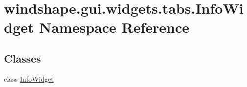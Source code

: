 \hypertarget{namespacewindshape_1_1gui_1_1widgets_1_1tabs_1_1_info_widget}{}\section{windshape.\+gui.\+widgets.\+tabs.\+Info\+Widget Namespace Reference}
\label{namespacewindshape_1_1gui_1_1widgets_1_1tabs_1_1_info_widget}
\subsection*{Classes}
\begin{DoxyCompactItemize}
\item 
class \mbox{\hyperlink{classwindshape_1_1gui_1_1widgets_1_1tabs_1_1_info_widget_1_1_info_widget}{Info\+Widget}}
\end{DoxyCompactItemize}
